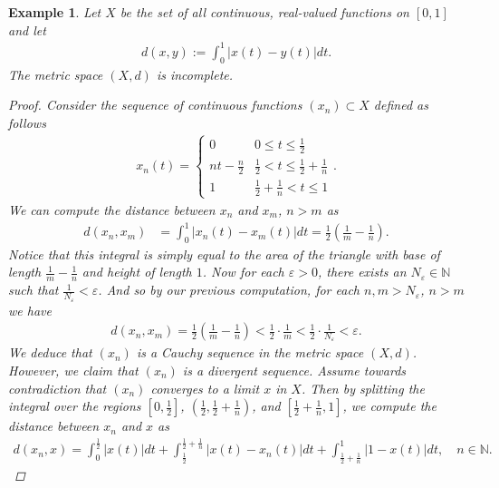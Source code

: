 \documentclass[11pt]{article}
\theoremstyle{mystyle}
\newtheorem{protoexamp}{Example}[section]
\newenvironment{examp}
{\colorlet{shadecolor}{orange!15}\begin{shaded}\begin{protoexamp}}
{\end{protoexamp}\end{shaded}}
\begin{document}
\begin{examp}
Let $X$ be the set of all continuous, real-valued functions on $[0, 1]$ and let 
\begin{align*}
    d(x, y) := \int_0^1 |x(t) - y(t)| dt.
\end{align*}
The metric space $(X, d)$ is incomplete.
\begin{proof}
Consider the sequence of continuous functions $(x_n) \subset X$ defined as follows
\begin{align*}
    x_n(t) = \begin{cases}
    0 & 0 \leq t \leq \frac{1}{2}\\
    nt - \frac{n}{2} & \frac{1}{2} < t \leq \frac{1}{2} + \frac{1}{n}\\
    1 & \frac{1}{2} + \frac{1}{n} < t \leq 1
    \end{cases}.
\end{align*}
We can compute the distance between $x_n$ and $x_m$, $n > m$ as
\begin{align*}
    d(x_n, x_m) &= \int_0^1 |x_n(t) - x_m(t)|dt = \frac{1}{2}\left(\frac{1}{m} - \frac{1}{n}\right).
\end{align*}
Notice that this integral is simply equal to the area of the triangle with base of length $\frac{1}{m} - \frac{1}{n}$ and height of length $1$.\newline
Now for each $\varepsilon > 0$, there exists an $N_{\varepsilon} \in \mathbb{N}$ such that $\frac{1}{N_{\varepsilon}} < \varepsilon$. And so by our previous computation, for each $n, m > N_{\varepsilon}$, $n > m$ we have
\begin{align*}
  d(x_n, x_m) =  \frac{1}{2}\left(\frac{1}{m} - \frac{1}{n}\right) < \frac{1}{2} \cdot \frac{1}{m}  < \frac{1}{2} \cdot \frac{1}{N_{\varepsilon}} <  \varepsilon.
\end{align*}
We deduce that $(x_n)$ is a Cauchy sequence in the metric space $(X, d)$.\newline
However, we claim that $(x_n)$ is a divergent sequence. Assume towards contradiction that $(x_n)$ converges to a limit $x$ in $X$. Then by splitting the integral over the regions $\left[0, \frac{1}{2} \right]$, $\left(\frac{1}{2},\frac{1}{2} + \frac{1}{n} \right)$, and $\left[\frac{1}{2} + \frac{1}{n}, 1 \right]$, we compute the distance between $x_n$ and $x$ as
\begin{align*}
    d(x_n, x) = \int_0^{\frac{1}{2}}|x(t)| dt + \int_{\frac{1}{2}}^{\frac{1}{2} + \frac{1}{n}}|x(t) - x_n(t)| dt  +  \int_{\frac{1}{2} + \frac{1}{n}}^1|1-x(t)| dt, \quad n \in \mathbb{N}.

\end{align*}
\end{proof}
\end{examp}
\end{document}
